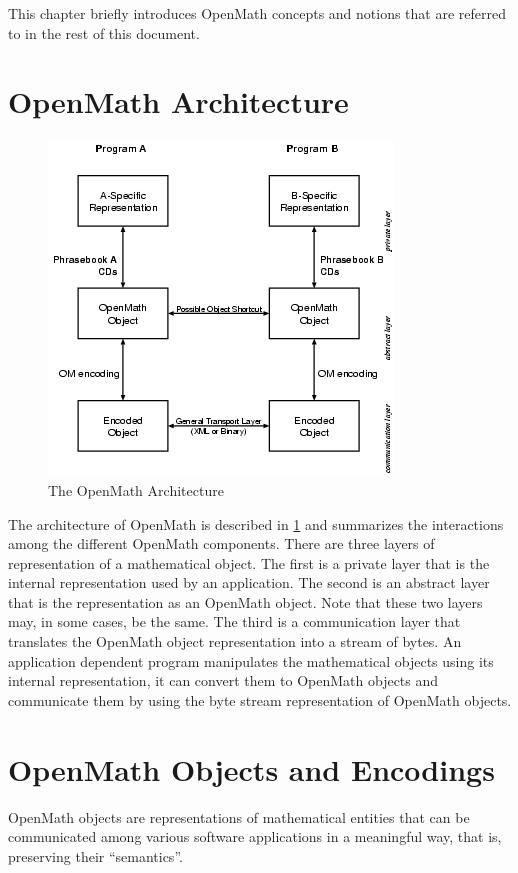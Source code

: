 \documentclass{report}
\def\textquote#1{``#1''}
\def\OM{OpenMath\xspace}
\begin{document}
This chapter briefly introduces \OM concepts and notions that are referred to in the rest
of this document.

\section{\OM Architecture}\label{sec_om-arch}


\begin{figure}\centering
  \includegraphics{om-arch}
  \caption{The \OM Architecture}\label{fig_om}
\end{figure}

The architecture of \OM is described in \ref{fig_om} and summarizes the interactions among
the different \OM components.  There are three layers of representation of a mathematical
object. The first is a private layer that is the internal representation used by an
application.  The second is an abstract layer that is the representation as an \OM object.
Note that these two layers may, in some cases, be the same.  The third is a communication
layer that translates the \OM object representation into a stream of bytes. An application
dependent program manipulates the mathematical objects using its internal representation,
it can convert them to \OM objects and communicate them by using the byte stream
representation of \OM objects.


\section{\OM Objects and Encodings}\label{sec_intro-obj}


\OM objects are representations of mathematical entities that
can be communicated among various software applications in a
meaningful way, that is, preserving their
\textquote{semantics}.
\end{document}
